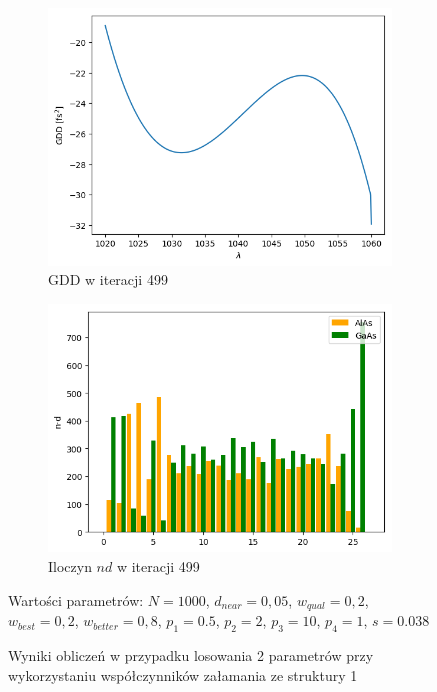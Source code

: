 \begin{figure} [ht!]
\begin{subfigure}[b]{0.31\textwidth}
        \includegraphics[width=\linewidth]{figures/wyniki/2stopien/dbr/result_gddresult499.png}
        \caption{GDD w iteracji 499}
    \end{subfigure}
        \begin{subfigure}[b]{0.32\textwidth}
        \includegraphics[width=\linewidth]{figures/wyniki/2stopien/dbr/result_ndresult499.png}
        \caption{Iloczyn $nd$ w iteracji 499}
    \end{subfigure}
    \caption{Wyniki obliczeń w przypadku losowania 2 parametrów przy wykorzystaniu współczynników załamania ze struktury 1}
    Wartości parametrów: $N= 1000$, $d_{near}= 0,05$, $w_{qual}=0,2$, $w_{best}=0,2$, $w_{better}=0,8$, $p_1=0.5$, $p_2=2$, $p_3=10$, $p_4=1$, $s=0.038$
    \label{fig:wyn2stp1}
\end{figure}

